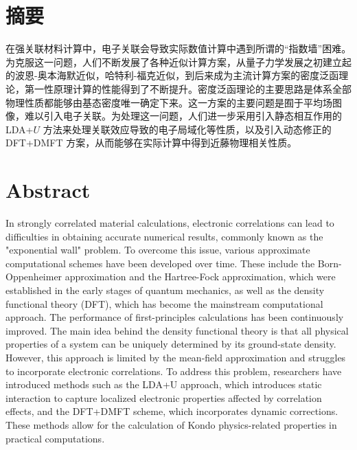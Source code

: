 

\intobmk\chapter*{摘\quad 要}%
\setcounter{page}{1}%

在强关联材料计算中，电子关联会导致实际数值计算中遇到所谓的“指数墙”困难。为克服这一问题，人们不断发展了各种近似计算方案，从量子力学发展之初建立起的波恩-奥本海默近似，哈特利-福克近似，到后来成为主流计算方案的密度泛函理论，第一性原理计算的性能得到了不断提升。密度泛函理论的主要思路是体系全部物理性质都能够由基态密度唯一确定下来。这一方案的主要问题是囿于平均场图像，难以引入电子关联。为处理这一问题，人们进一步采用引入静态相互作用的 LDA+$U$ 方法来处理关联效应导致的电子局域化等性质，以及引入动态修正的 DFT+DMFT 方案，从而能够在实际计算中得到近藤物理相关性质。

\intobmk\chapter*{Abstract}%

In strongly correlated material calculations, electronic correlations can lead to difficulties in obtaining accurate numerical results, commonly known as the "exponential wall" problem. To overcome this issue, various approximate computational schemes have been developed over time. These include the Born-Oppenheimer approximation and the Hartree-Fock approximation, which were established in the early stages of quantum mechanics, as well as the density functional theory (DFT), which has become the mainstream computational approach. The performance of first-principles calculations has been continuously improved. The main idea behind the density functional theory is that all physical properties of a system can be uniquely determined by its ground-state density. However, this approach is limited by the mean-field approximation and struggles to incorporate electronic correlations. To address this problem, researchers have introduced methods such as the LDA+U approach, which introduces static interaction to capture localized electronic properties affected by correlation effects, and the DFT+DMFT scheme, which incorporates dynamic corrections. These methods allow for the calculation of Kondo physics-related properties in practical computations.


\pagestyle{enfrontmatterstyle}%
\cleardoublepage\pagestyle{frontmatterstyle}%

